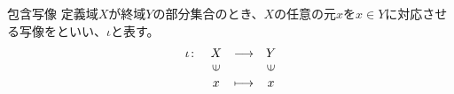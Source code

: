 \documentclass[../../../topic_linear-algebra]{subfiles}
\begin{document}
\begin{definition*}{包含写像}
  定義域$X$が終域$Y$の部分集合のとき、$X$の任意の元$x$を$x \in Y$に対応させる写像をといい、$\iota$と表す。
  \begin{equation*}
  \begin{array}{lclc}
    \iota \colon & X         & \longrightarrow & Y          \\
            & \rotatebox{90}{$\in$} &                 & \rotatebox{90}{$\in$} \\
            & x              & \longmapsto     & x
  \end{array}
\end{equation*}
\end{definition*}
\end{document}
